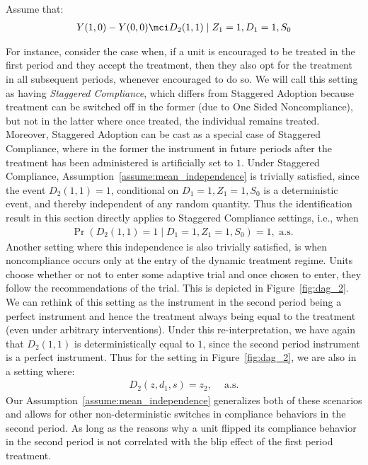 \begin{assumption}\label{assume:mean_independence}
Assume that:
\begin{align}
        Y(1,0) - Y(0,0) \mci D_2(1, 1) \mid Z_1=1, D_1=1, S_0 
\end{align}
\end{assumption}
For instance, consider the case when, if a unit is encouraged to be treated in the first period and they accept the treatment, then they also opt for the treatment in all subsequent periods, whenever encouraged to do so.
We will call this setting as having \emph{Staggered Compliance}, which differs from Staggered Adoption because treatment can be switched off in the former (due to One Sided Noncompliance), but not in the latter where once treated, the individual remains treated.
Moreover, Staggered Adoption can be cast as a special case of Staggered Compliance, where in the former the instrument in future periods after the treatment has been administered is artificially set to $1$. Under Staggered Compliance, Assumption~\ref{assume:mean_independence} is trivially satisfied, since the event $D_2(1,1)=1$, conditional on $D_1=1, Z_1=1, S_0$ is a deterministic event, and thereby independent of any random quantity. Thus the identification result in this section directly applies to Staggered Compliance settings, i.e., when
\begin{align}
    \Pr(D_2(1,1) = 1\mid D_1=1, Z_1=1, S_0)=1, \text{ a.s. } \tag{Staggered Compliance}
\end{align}
Another setting where this independence is also trivially satisfied, is when noncompliance occurs only at the entry of the dynamic treatment regime. Units choose whether or not to enter some adaptive trial and once chosen to enter, they follow the recommendations of the trial. This is depicted in Figure~\ref{fig:dag_2}. We can rethink of this setting as the instrument in the second period being a perfect instrument and hence the treatment always being equal to the treatment (even under arbitrary interventions). Under this re-interpretation, we have again that $D_2(1,1)$ is deterministically equal to $1$, since the second period instrument is a perfect instrument. Thus for the setting in Figure~\ref{fig:dag_2}, we are also in a setting where:
\begin{align}
    D_2(z, d_1, s) = z_2, ~\quad\text{a.s.}\tag{endogenous entry into adaptive trial}
\end{align}
Our Assumption~\ref{assume:mean_independence} generalizes both of these scenarios and allows for other non-deterministic switches in compliance behaviors in the second period. As long as the reasons why a unit flipped its compliance behavior in the second period is not correlated with the blip effect of the first period treatment.

